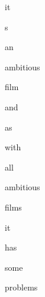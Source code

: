 \documentclass[varwidth]{standalone}
\begin{document}
\begin{CJK*}{UTF8}{gbsn}
{\setlength{\fboxsep}{0pt}\colorbox{white!0}{\parbox{0.8\textwidth}{
\colorbox{red!4.959763}{\strut it} \colorbox{red!0.99360085}{\strut s} \colorbox{red!4.0769906}{\strut an} \colorbox{blue!3.155246}{\strut ambitious} \colorbox{red!6.9123397}{\strut film} \colorbox{red!3.2241743}{\strut and} \colorbox{red!2.7444723}{\strut as} \colorbox{red!4.2769833}{\strut with} \colorbox{red!3.4726505}{\strut all} \colorbox{red!5.692273}{\strut ambitious} \colorbox{red!5.3901095}{\strut films} \colorbox{red!6.6216393}{\strut it} \colorbox{red!11.80113}{\strut has} \colorbox{red!11.648758}{\strut some} \colorbox{red!87.46094}{\strut problems} 
}}}
\end{CJK*}
\end{document}
